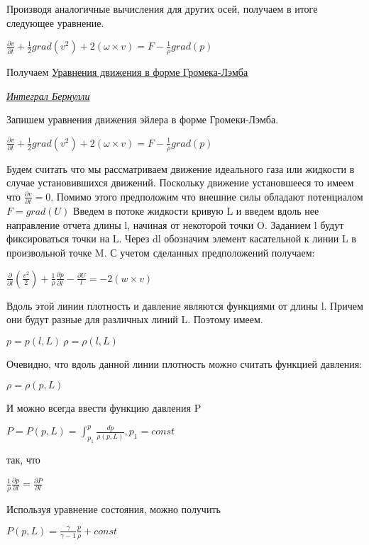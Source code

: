 Производя аналогичные вычисления для других осей, получаем в итоге следующее уравнение.
\begin{center}
	$\frac{\partial v}{\partial t} + \frac{1}{2}grad(v^2) + 2(\omega\times v) = F - \frac{1}{\rho}grad(p)$
\end{center}
Получаем \underline{Уравнения движения в форме Громека-Лэмба}
\begin{center}
	\textit{\underline{Интеграл Бернулли}}
\end{center}
Запишем уравнения движения эйлера в форме Громеки-Лэмба.
\begin{center}
	$\frac{\partial v}{\partial t} + \frac{1}{2}grad(v^2) + 2(\omega\times v) = F - \frac{1}{\rho}grad(p)$
\end{center}
Будем считать что мы рассматриваем движение идеального газа или жидкости в случае установившихся движений. Поскольку движение установшееся то имеем что $\frac{\partial v}{\partial t} = 0$. Помимо этого предположим что внешние силы обладают потенциалом $F = grad(U)$
Введем в потоке жидкости кривую L и введем вдоль нее направление отчета длины l, начиная от некоторой точки O. Заданием l будут фиксироваться точки на L. Через dl обозначим элемент касательной к линии L в произвольной точке M. С учетом сделанных предположений получаем:
\begin{center}
	$\frac{\partial}{\partial l}(\frac{v^2}{2}) + \frac{1}{\rho} \frac{\partial p}{\partial l} - \frac{\partial U}{l} = -2(w\times v)$
\end{center}
Вдоль этой линии плотность и давление являются функциями от длины l. Причем они будут разные для различных линий L. Поэтому имеем.
\begin{center}
	$p = p(l,L) \ \rho = \rho(l,L)$
\end{center}
Очевидно, что вдоль данной линии плотность можно считать функцией давления:
\begin{center}
	$\rho = \rho(p,L)$
\end{center}
И можно всегда ввести функцию давления P
\begin{center}
	$P = P(p,L) = \int_{p_1}^p\frac{dp}{\rho(p,L)}, p_1 = const$
\end{center}
так, что 
\begin{center}
	$\frac{1}{\rho}\frac{\partial p}{\partial l} = \frac{\partial P}{\partial l}$
\end{center}
Используя уравнение состояния, можно получить
\begin{center}
	$P(p,L) = \frac{\gamma}{\gamma - 1}\frac{p}{\rho} + const$
\end{center}

